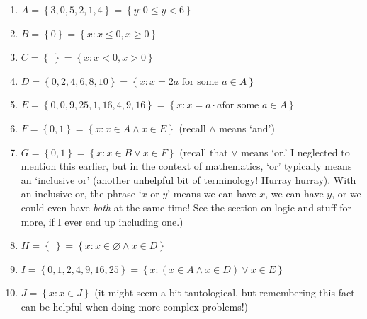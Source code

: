\documentclass[10pt]{article}
\theoremstyle{definition}
\newcommand{\set}[1]{\left\{ #1 \right\}}
\begin{document}
\begin{enumerate}
    \item $A = \set{3,0,5,2,1,4} = \set{y:0\leq y<6}$
    \item $B = \set{0} = \set{x:x\leq 0, x\geq 0}$
    \item $C = \set{~} = \set{x:x<0,x>0}$
    \item $D = \set{0,2,4,6,8,10} = \set{x:x=2a\text{ for some }a\in
        A}$
    \item $E = \set{0,0,9,25,1,16,4,9,16} = \set{x:x=a\cdot a \text{
          for some }a\in A}$
    \item $F = \set{0,1} = \set{x:x\in A \land x\in E}$ (recall
      $\land$ means `and')
    \item $G = \set{0,1} = \set{x:x\in B \lor x\in F}$ (recall that
      $\lor$ means `or.'  I neglected to mention this earlier, but in
      the context of mathematics, `or' typically means an `inclusive
      or' (another unhelpful bit of terminology! Hurray hurray).  With
      an inclusive or, the phrase `$x$ or $y$' means we can have $x$,
      we can have $y$, or we could even have \emph{both} at the same
      time!  See the section on logic and stuff for more, if I ever
      end up including one.)
    \item $H = \set{~} = \set{x:x\in \varnothing\land x\in D}$
    \item $I = \set{0,1,2,4,9,16,25} = \set{x:(x\in A\land x\in D)\lor x\in E}$
    \item $J = \set{x:x\in J}$ (it might seem a bit tautological, but
      remembering this fact can be helpful when doing more complex
      problems!)
\end{enumerate}
\end{document}
